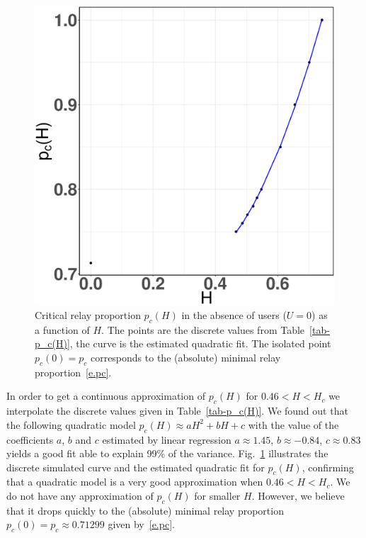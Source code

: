 \documentclass[conference]{IEEEtran}
\begin{document}
\begin{figure}[t!]
\centering
\includegraphics[width=0.50\linewidth]{Figures/pcH}
\vspace{-1ex}
\caption{Critical relay proportion $p_c(H)$ in the absence of users ($U=0$) as a function of $H$. The  points are the discrete values from Table~\ref{tab-p_c(H)}, the curve is the estimated quadratic fit.
The isolated point $p_c(0)=p_c$ corresponds to the (absolute) minimal relay proportion~\eqref{e.pc}. }
\label{quadratic-fit-p_c(H)}
\vspace{-3ex}
\end{figure}


\indent  In order to get a continuous approximation of $p_c(H)$ for $0.46<H<H_c$ we interpolate the discrete values given in Table~\ref{tab-p_c(H)}. 
We found out that the following quadratic model %
$p_c(H) \approx aH^{2} + bH + c$
with the  value of the coefficients $a$, $b$ and $c$ estimated by linear regression
$a \approx 1.45$, $b \approx -0.84$, $c \approx 0.83$
yields a good fit able to explain 99\% of the variance. Fig.~\ref{quadratic-fit-p_c(H)} illustrates the discrete simulated curve and the estimated quadratic fit for $p_c(H)$, confirming that a quadratic model is a very good approximation when  $0.46<H<H_c$. We do not have any approximation of $p_c(H)$ for smaller $H$. However, we believe that it drops quickly to the (absolute) minimal relay proportion
$p_c(0)=p_c\approx 0.71299$ given by~\eqref{e.pc}.
\end{document}
